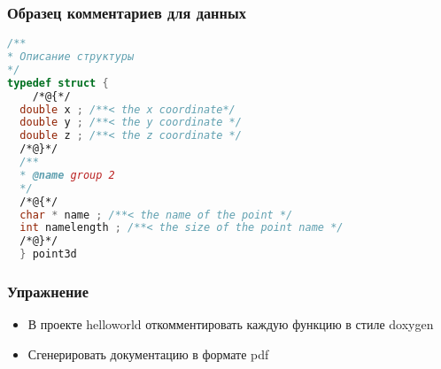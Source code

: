 \begin{frame}[fragile]
 \frametitle{Образец комментариев для данных}
\begin{lstlisting}[language=C]
/** 
* Описание структуры 
*/
typedef struct { 
	/*@{*/ 
  double x ; /**< the x coordinate*/ 
  double y ; /**< the y coordinate */
  double z ; /**< the z coordinate */
  /*@}*/
  /** 
  * @name group 2 
  */
  /*@{*/
  char * name ; /**< the name of the point */
  int namelength ; /**< the size of the point name */
  /*@}*/
  } point3d
\end{lstlisting}
\end{frame}


\begin{frame}
 \frametitle{Упражнение}
  \begin{itemize}
    \item В проекте helloworld откомментировать каждую функцию в стиле doxygen
    \item Сгенерировать документацию в формате pdf
  \end{itemize}
\end{frame} 
